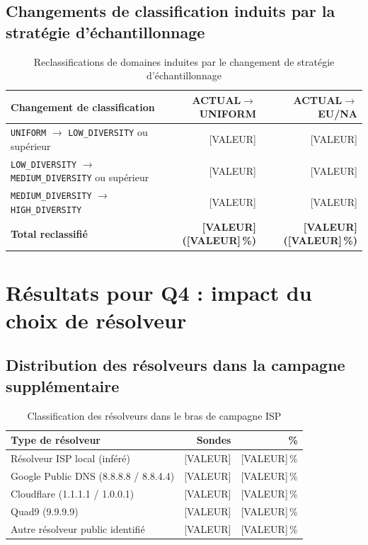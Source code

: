 \subsection{Changements de classification induits par la stratégie d'échantillonnage}
\label{subsec:4.4.4}

\begin{table}[H]
\centering
\small
\begin{tabularx}{\linewidth}{X r r}
\toprule
\textbf{Changement de classification} & \textbf{ACTUAL$\to$UNIFORM} & \textbf{ACTUAL$\to$EU/NA} \\
\midrule
\texttt{UNIFORM} $\to$ \texttt{LOW\_DIVERSITY} ou supérieur & [VALEUR] & [VALEUR] \\
\texttt{LOW\_DIVERSITY} $\to$ \texttt{MEDIUM\_DIVERSITY} ou supérieur & [VALEUR] & [VALEUR] \\
\texttt{MEDIUM\_DIVERSITY} $\to$ \texttt{HIGH\_DIVERSITY} & [VALEUR] & [VALEUR] \\
\textbf{Total reclassifié} & \textbf{[VALEUR] ([VALEUR]\,\%)} & \textbf{[VALEUR] ([VALEUR]\,\%)} \\
\bottomrule
\end{tabularx}
\caption{Reclassifications de domaines induites par le changement de stratégie d'échantillonnage}
\label{tab:reclassifications}
\end{table}

\bigskip
\section{Résultats pour Q4 : impact du choix de résolveur}
\label{sec:4.5}

\subsection{Distribution des résolveurs dans la campagne supplémentaire}
\label{subsec:4.5.1}

\begin{table}[H]
\centering
\small
\begin{tabularx}{\linewidth}{X r r}
\toprule
\textbf{Type de résolveur} & \textbf{Sondes} & \textbf{\%} \\
\midrule
Résolveur ISP local (inféré) & [VALEUR] & [VALEUR]\,\% \\
Google Public DNS (8.8.8.8 / 8.8.4.4) & [VALEUR] & [VALEUR]\,\% \\
Cloudflare (1.1.1.1 / 1.0.0.1) & [VALEUR] & [VALEUR]\,\% \\
Quad9 (9.9.9.9) & [VALEUR] & [VALEUR]\,\% \\
Autre résolveur public identifié & [VALEUR] & [VALEUR]\,\% \\
\bottomrule
\end{tabularx}
\caption{Classification des résolveurs dans le bras de campagne ISP}
\label{tab:resolver_classification}
\end{table}

